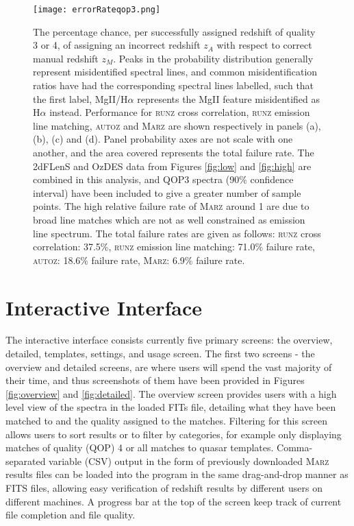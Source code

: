 \documentclass[iop]{emulateapj}
\newcommand{\runz}{\textsc{runz}}
\newcommand{\autoz}{\textsc{autoz}}
\newcommand{\marz}{\textsc{Marz}}
\begin{document}
\begin{figure}[h]
\centering
\texttt{[image: errorRateqop3.png]}
\caption{The percentage chance, per successfully assigned redshift of quality 3 or 4, of assigning an incorrect redshift $z_A$ with respect to correct manual redshift $z_M$. Peaks in the probability distribution generally represent misidentified spectral lines, and common misidentification ratios have had the corresponding spectral lines labelled, such that the first label, MgII/H$\alpha$ represents the MgII feature misidentified as H$\alpha$ instead. Performance for \runz{} cross correlation, \runz{} emission line matching, \autoz{} and \marz{} are shown respectively in panels (a), (b), (c) and (d). Panel probability axes are not scale with one another, and the area covered represents the total failure rate. The 2dFLenS and OzDES data from Figures \ref{fig:low} and \ref{fig:high} are combined in this analysis, and QOP3 spectra (90\% confidence interval) have been included to give a greater number of sample points. The high relative failure rate of \marz{} around 1 are due to broad line matches which are not as well constrained as emission line spectrum. The total failure rates are given as follows: \runz{} cross correlation: 37.5\%, \runz{} emission line matching: 71.0\% failure rate, \autoz{}: 18.6\% failure rate, \marz{}: 6.9\% failure rate.}
\label{fig:f4}
\end{figure}











\section{Interactive Interface}

The interactive interface consists currently five primary screens: the overview, detailed, templates, settings, and usage screen. The first two screens - the overview and detailed screens, are where users will spend the vast majority of their time, and thus screenshots of them have been provided in Figures \ref{fig:overview} and \ref{fig:detailed}. The overview screen provides users with a high level view of the spectra in the loaded FITs file, detailing what they have been matched to and the quality assigned to the matches. Filtering for this screen allows users to sort results or to filter by categories, for example only displaying matches of quality (QOP) 4 or all matches to quasar templates. Comma-separated variable (CSV) output in the form of previously downloaded \marz{} results files can be loaded into the program in the same drag-and-drop manner as FITS files, allowing easy verification of redshift results by different users on different machines. A progress bar at the top of the screen keep track of current file completion and file quality.\\
\end{document}
